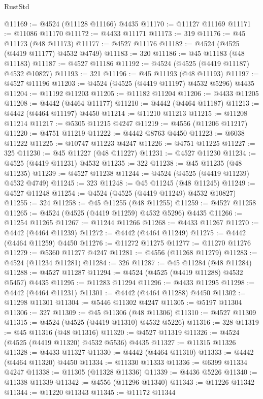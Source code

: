 \begin{lexlean}{RustStd}
\begin{coremodule}
@11169 := @4524 (@11128 @11166) @4435
@11170 := @11127 @11169
@11171 := @11086 @11170
@11172 := @4433 @11171
@11173 := 319
@11176 := @45 @11173 (@48 @11173)
@11177 := @4527 @11176
@11182 := @4524 (@4525 (@4419 @11177) @4532 @4749)
@11183 := 320
@11186 := @45 @11183 (@48 @11183)
@11187 := @4527 @11186
@11192 := @4524 (@4525 (@4419 @11187) @4532 @10827)
@11193 := 321
@11196 := @45 @11193 (@48 @11193)
@11197 := @4527 @11196
@11203 := @4524 (@4525 (@4419 @11197) @4532 @5296) @4435
@11204 := @11192 @11203
@11205 := @11182 @11204
@11206 := @4433 @11205
@11208 := @4442 (@4464 @11177)
@11210 := @4442 (@4464 @11187)
@11213 := @4442 (@4464 @11197) @4450
@11214 := @11210 @11213
@11215 := @11208 @11214
@11217 := @5305 @11215 @4247
@11219 := @4556 (@11206 @11217)
@11220 := @4751 @11219
@11222 := @4442 @8763 @4450
@11223 := @6038 @11222
@11225 := @10747 @11223 @4247
@11226 := @4751 @11225
@11227 := 325
@11230 := @45 @11227 (@48 @11227)
@11231 := @4527 @11230
@11234 := @4525 (@4419 @11231) @4532
@11235 := 322
@11238 := @45 @11235 (@48 @11235)
@11239 := @4527 @11238
@11244 := @4524 (@4525 (@4419 @11239) @4532 @4749)
@11245 := 323
@11248 := @45 @11245 (@48 @11245)
@11249 := @4527 @11248
@11254 := @4524 (@4525 (@4419 @11249) @4532 @10827)
@11255 := 324
@11258 := @45 @11255 (@48 @11255)
@11259 := @4527 @11258
@11265 := @4524 (@4525 (@4419 @11259) @4532 @5296) @4435
@11266 := @11254 @11265
@11267 := @11244 @11266
@11268 := @4433 @11267
@11270 := @4442 (@4464 @11239)
@11272 := @4442 (@4464 @11249)
@11275 := @4442 (@4464 @11259) @4450
@11276 := @11272 @11275
@11277 := @11270 @11276
@11279 := @5360 @11277 @4247
@11281 := @4556 (@11268 @11279)
@11283 := @4524 (@11234 @11281)
@11284 := 326
@11287 := @45 @11284 (@48 @11284)
@11288 := @4527 @11287
@11294 := @4524 (@4525 (@4419 @11288) @4532 @5457) @4435
@11295 := @11283 @11294
@11296 := @4433 @11295
@11298 := @4442 (@4464 @11231)
@11301 := @4442 (@4464 @11288) @4450
@11302 := @11298 @11301
@11304 := @5446 @11302 @4247
@11305 := @5197 @11304
@11306 := 327
@11309 := @45 @11306 (@48 @11306)
@11310 := @4527 @11309
@11315 := @4524 (@4525 (@4419 @11310) @4532 @5226)
@11316 := 328
@11319 := @45 @11316 (@48 @11316)
@11320 := @4527 @11319
@11326 := @4524 (@4525 (@4419 @11320) @4532 @5536) @4435
@11327 := @11315 @11326
@11328 := @4433 @11327
@11330 := @4442 (@4464 @11310)
@11333 := @4442 (@4464 @11320) @4450
@11334 := @11330 @11333
@11336 := @6399 @11334 @4247
@11338 := @11305 (@11328 @11336)
@11339 := @4436 @5226
@11340 := @11338 @11339
@11342 := @4556 (@11296 @11340)
@11343 := @11226 @11342
@11344 := @11220 @11343
@11345 := @11172 @11344

\end{coremodule}
\end{lexlean}
